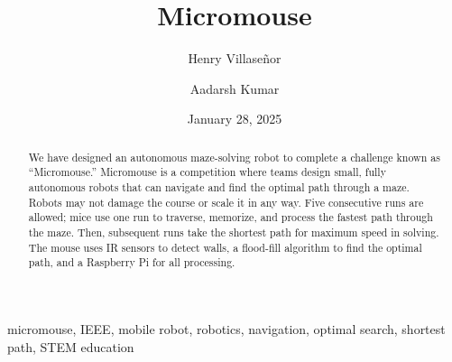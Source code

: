 ﻿\documentclass[12pt,conference,onecolumn]{IEEEtran}
\title{Micromouse}
\author{Henry Villase\~{n}or \and Aadarsh Kumar}
\date{January 28, 2025}
\newcommand{\keywords}{micromouse, IEEE, mobile robot, robotics, navigation, optimal search, shortest path, STEM education}
\begin{document}
\maketitle 

\begin{abstract}
We have designed an autonomous maze-solving robot to complete a challenge known as ``Micromouse.'' Micromouse is a competition where teams design small, fully autonomous robots that can navigate and find the optimal path through a maze. Robots may not damage the course or scale it in any way. Five consecutive runs are allowed; mice use one run to traverse, memorize, and process the fastest path through the maze. Then, subsequent runs take the shortest path for maximum speed in solving. The mouse uses IR sensors to detect walls, a flood-fill algorithm to find the optimal path, and a Raspberry Pi for all processing.
\end{abstract}

\begin{IEEEkeywords}
\keywords
\end{IEEEkeywords}
\end{document}
